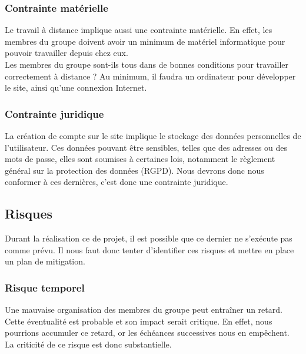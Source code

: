 \documentclass[a4paper,11pt]{article}
\begin{document}
\subsubsection{Contrainte matérielle}

Le travail à distance implique aussi une contrainte matérielle. En effet, les membres du groupe doivent
avoir un minimum de matériel informatique pour pouvoir travailler depuis chez eux.\\

Les membres du groupe sont-ils tous dans de bonnes conditions pour travailler correctement à
distance ? Au minimum, il faudra un ordinateur pour développer le site, ainsi qu’une connexion
Internet.\\

\subsubsection{Contrainte juridique}

La création de compte sur le site implique le stockage des données personnelles de l’utilisateur. Ces
données pouvant être sensibles, telles que des adresses ou des mots de passe, elles sont soumises à
certaines lois, notamment le règlement général sur la protection des données (RGPD). Nous devrons donc nous
conformer à ces dernières, c'est donc une contrainte juridique.\\

\pagebreak

\subsection{Risques}

Durant la réalisation ce de projet, il est possible que ce dernier ne s’exécute pas comme prévu. Il nous
faut donc tenter d’identifier ces risques et mettre en place un plan de mitigation.\\

\subsubsection{Risque temporel}

Une mauvaise organisation des membres du groupe peut entraîner un retard. Cette éventualité est
probable et son impact serait critique. En effet, nous pourrions accumuler ce retard, or les échéances
successives nous en empêchent. La criticité de ce risque est donc substantielle.\\
\end{document}
